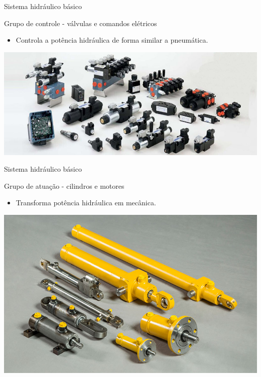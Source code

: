 \begin{frame}{Sistema hidráulico básico}
	\begin{block}{Grupo de controle - válvulas e comandos elétricos}
		\begin{itemize}
			\item Controla a potência hidráulica de forma similar a pneumática.
		\end{itemize}
	\end{block}

	\medskip
	
	\centering
	\includegraphics[width=0.8\linewidth]{Figuras/Ch15/fig10}
	
\end{frame}


\begin{frame}{Sistema hidráulico básico}
	\begin{block}{Grupo de atuação - cilindros e motores}
		\begin{itemize}
			\item Transforma potência hidráulica em mecânica.
		\end{itemize}
	\end{block}

	\medskip
	
	\centering
	\includegraphics[width=0.7\linewidth]{Figuras/Ch15/fig11}
	
\end{frame}


